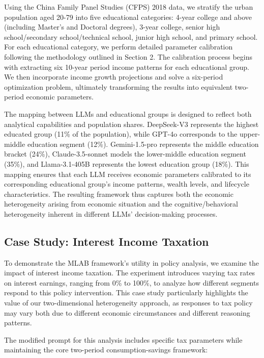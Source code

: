 \documentclass[12pt]{article}
\begin{document}
\begin{CJK*}{UTF8}{gbsn}
Using the China Family Panel Studies (CFPS) 2018 data, we stratify the urban population aged 20-79 into five educational categories: 4-year college and above (including Master's and Doctoral degrees), 3-year college, senior high school/secondary school/technical school, junior high school, and primary school. For each educational category, we perform detailed parameter calibration following the methodology outlined in Section 2. The calibration process begins with extracting six 10-year period income patterns for each educational group. We then incorporate income growth projections and solve a six-period optimization problem, ultimately transforming the results into equivalent two-period economic parameters.

The mapping between LLMs and educational groups is designed to reflect both analytical capabilities and population shares. DeepSeek-V3 represents the highest educated group (11\% of the population), while GPT-4o corresponds to the upper-middle education segment (12\%). Gemini-1.5-pro represents the middle education bracket (24\%), Claude-3.5-sonnet models the lower-middle education segment (35\%), and Llama-3.1-405B represents the lowest education group (18\%). This mapping ensures that each LLM receives economic parameters calibrated to its corresponding educational group's income patterns, wealth levels, and lifecycle characteristics. The resulting framework thus captures both the economic heterogeneity arising from economic situation and the cognitive/behavioral heterogeneity inherent in different LLMs' decision-making processes.

\subsection{Case Study: Interest Income Taxation}

To demonstrate the MLAB framework's utility in policy analysis, we examine the impact of interest income taxation. The experiment introduces varying tax rates on interest earnings, ranging from 0\% to 100\%, to analyze how different segments respond to this policy intervention. This case study particularly highlights the value of our two-dimensional heterogeneity approach, as responses to tax policy may vary both due to different economic circumstances and different reasoning patterns.

The modified prompt for this analysis includes specific tax parameters while maintaining the core two-period consumption-savings framework:


\end{CJK*}
\end{document}
